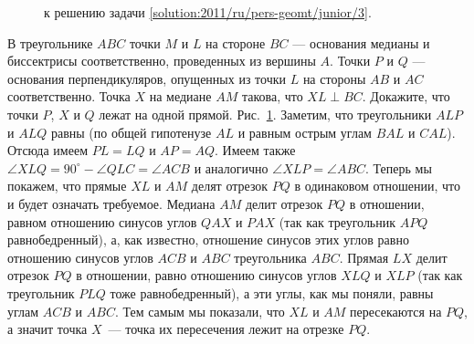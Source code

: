 \ifsolution
\begin{figure}\centering
    \caption{к решению задачи \ref{solution:2011/ru/pers-geomt/junior/3}.}
    \label{fig:solution:2011/ru/pers-geomt/junior/3}
\end{figure}%
\fi %

\problem
В треугольнике $ABC$ точки $M$ и $L$ на стороне $BC$ --- основания медианы и
биссектрисы соответственно, проведенных из вершины $A$.
Точки $P$ и $Q$ --- основания перпендикуляров, опущенных из точки $L$ на
стороны $AB$ и $AC$ соответственно.
Точка $X$ на медиане $AM$ такова, что $XL \perp BC$.
Докажите, что точки $P$, $X$ и $Q$ лежат на одной прямой. 
\solution
\label{solution:2011/ru/pers-geomt/junior/3}%
Рис.~\ref{fig:solution:2011/ru/pers-geomt/junior/3}.
Заметим, что треугольники $ALP$ и $ALQ$ равны
(по общей гипотенузе $AL$ и равным острым углам $BAL$ и $CAL$).
Отсюда имеем $PL = LQ$ и $AP = AQ$.
Имеем также
$\angle XLQ = 90^\circ - \angle QLC = \angle ACB$
и аналогично $\angle XLP = \angle ABC$.
Теперь мы покажем, что прямые $XL$ и $AM$ делят отрезок $PQ$ в одинаковом
отношении, что и будет означать требуемое.
Медиана $AM$ делит отрезок $PQ$ в отношении, равном отношению синусов углов
$QAX$ и $PAX$ (так как треугольник $APQ$ равнобедренный), а, как известно,
отношение синусов этих углов равно отношению синусов углов $ACB$ и $ABC$
треугольника $ABC$.
Прямая $LX$ делит отрезок $PQ$ в отношении, равно отношению синусов углов $XLQ$
и $XLP$ (так как треугольник $PLQ$ тоже равнобедренный), а эти углы, как мы
поняли, равны углам $ACB$ и $ABC$.
Тем самым мы показали, что $XL$ и $AM$ пересекаются на $PQ$, а значит точка
$X$~--- точка их пересечения лежит на отрезке $PQ$.
\endproblem
